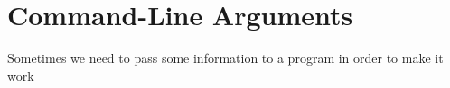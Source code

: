 \documentclass[../main.tex]{subfiles}
\begin{document}
\section{Command-Line Arguments}
Sometimes we need to pass some information to a program in order to make it work
\end{document}
